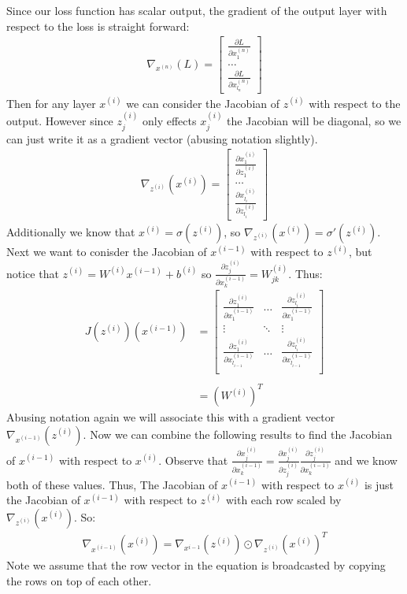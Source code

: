 \documentclass[12pt]{article}
\begin{document}
Since our loss function has scalar output, the gradient of the output layer
with respect to the loss is straight forward:
\begin{align*}
    \nabla_{x^{(n)}}(L) = \begin{bmatrix}
        \frac{\partial L}{\partial x^{(n)}_1} \\ \ldots \\ \frac{\partial L}{\partial x^{(n)}_{l_n}}
    \end{bmatrix}
\end{align*}
Then for any layer $x^{(i)}$ we can consider the Jacobian of $z^{(i)}$ with
respect to the output. However since $z^{(i)}_j$ only effects $x^{(i)}_j$ the
Jacobian will be diagonal, so we can just write it as a gradient vector (abusing notation
slightly).
\begin{align*}
        \nabla_{z^{(i)}}(x^{(i)}) = \begin{bmatrix}
        \frac{\partial x^{(i)}_1}{\partial z^{(i)}_1} \\ \ldots \\ \frac{\partial x^{(i)}_{l_i}}{\partial z^{(i)}_{l_i}}
    \end{bmatrix}
\end{align*}
Additionally we know that $x^{(i)} = \sigma(z^{(i)})$, so $\nabla_{z^{(i)}}(x^{(i)}) = \sigma'(z^{(i)})$. 
Next we want to conisder the Jacobian of $x^{(i-1)}$ with respect to $z^{(i)}$, but notice that
$z^{(i)} = W^{(i)}x^{(i-1)} + b^{(i)}$ so $\frac{\partial z^{(i)}_j}{\partial x^{(i-1)}_k} = W^{(i)}_{jk}$. Thus:
\begin{align*}
    J(z^{(i)})(x^{(i-1)}) &= \begin{bmatrix}
        \frac{\partial z^{(i)}_1}{\partial x^{(i-1)}_1} & \ldots  & \frac{\partial z^{(i)}_{l_i}}{\partial x^{(i-1)}_1} \\
        \vdots & \ddots & \vdots \\
        \frac{\partial z^{(i)}_1}{\partial x^{(i-1)}_{l_{i-1}}} & \ldots  & \frac{\partial z^{(i)}_{l_i}}{\partial x^{(i-1)}_{l_{i-1}}} \\
    \end{bmatrix}
    \\ \\
    &= (W^{(i)})^T
\end{align*}
Abusing notation again we will associate this with a gradient vector $\nabla_{x^{(i-1)}}(z^{(i)})$. Now we can combine the following results to find
the Jacobian of $x^{(i-1)}$ with respect to $x^{(i)}$. Observe that $\frac{\partial x^{(i)}_j}{\partial x^{(i-1)}_k} = 
\frac{\partial x^{(i)}_j}{\partial z^{(i)}_j}\frac{\partial z^{(i)}_j}{\partial x^{(i-1)}_k}$ and we know both of these values.
Thus, The Jacobian of $x^{(i-1)}$ with respect to $x^{(i)}$ is just the  Jacobian of $x^{(i-1)}$ with respect to $z^{(i)}$ with each row
scaled by $\nabla_{z^{(i)}}(x^{(i)})$. So:
\begin{align*}
    \nabla_{x^{(i-1)}}(x^{(i)}) = \nabla_{x^{i-1}}(z^{(i)}) \odot \nabla_{z^{(i)}}(x^{(i)})^T
\end{align*}
Note we assume that the row vector in the equation is broadcasted by copying the rows on top of each other.
\end{document}
